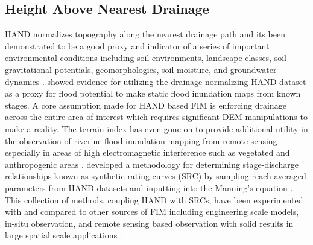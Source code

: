 \subsection{Height Above Nearest Drainage}
%
HAND normalizes topography along the nearest drainage path and its been demonstrated to be a good proxy and indicator of a series of important environmental conditions including soil environments, landscape classes, soil gravitational potentials, geomorphologies, soil moisture, and groundwater dynamics \cite{renno2008hand,nobre2011height}. 
 showed evidence for utilizing the drainage normalizing HAND dataset as a proxy for flood potential to make static flood inundation maps from known stages.
A core assumption made for HAND based FIM is enforcing drainage across the entire area of interest which requires significant DEM manipulations to make a reality.
The terrain index has even gone on to provide additional utility in the observation of riverine flood inundation mapping from remote sensing especially in areas of high electromagnetic interference such as vegetated and anthropogenic areas \cite{aristizabal2020high,shastry2019using,huang2017comparison,twele2016sentinel}.
 developed a methodology for determining stage-discharge relationships known as synthetic rating curves (SRC) by sampling reach-averaged parameters from HAND datasets and inputting into the Manning's equation \cite{gauckler1867etudes,manning1890flow}.
This collection of methods, coupling HAND with SRCs, have been experimented with and compared to other sources of FIM including engineering scale models, in-situ observation, and remote sensing based observation with solid results in large spatial scale applications \cite{godbout2019error,johnson2019integrated,garousi2019terrain,nobre2016hand,afshari2018comparison,zheng2018geoflood,teng2015rapid,teng2017flood,zhang2018comparative}.
%
